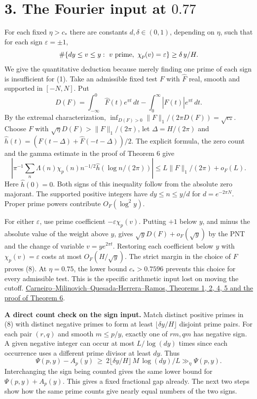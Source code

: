 \documentclass[11pt]{article}
\newcommand{\ch}{\chi_p}
\newcommand{\CM}{\href{https://arxiv.org/pdf/2404.08380v2}{Carneiro--Milinovich--Quesada-Herrera--Ramos, Theorems 1, 2, 4, 5 and the proof of Theorem 6}}
\begin{document}
\section*{3. The Fourier input at \(0.77\)}
For each fixed \(\eta>c_*\) there are constants \(d,\delta\in(0,1)\),
depending on \(\eta\), such that for each sign \(\varepsilon=\pm1\),
\begin{equation}
 \#\{d y\le v\le y:\ v\ {\rm prime},\ \ch(v)=\varepsilon\}
       \ge\delta\,y/H .
 \label{eq:both}
\end{equation}
We give the quantitative deduction because merely finding one prime of
each sign is insufficient for (1). Take an admissible fixed test \(F\)
with \(\widehat F\) real, smooth and supported in \([-N,N]\). Put
\[
 D(F)=\int_{-\infty}^0\widehat F(t)e^{\pi t}\,dt
              -\int_0^\infty|\widehat F(t)|e^{\pi t}\,dt.
\]
By the extremal characterization, \(\inf_{D(F)>0}\|F\|_1/(2\pi D(F))
=\sqrt{c_*}\). Choose \(F\) with
\(\sqrt\eta D(F)>\|F\|_1/(2\pi)\), let \(\Delta=H/(2\pi)\) and
\(\widehat h(t)=(\widehat F(t-\Delta)+\widehat F(-t-\Delta))/2\).
The explicit formula, the zero count and the gamma estimate in the proof
of Theorem 6 give
\[
 \left|\pi^{-1}\sum_n\Lambda(n)\ch(n)n^{-1/2}
                 \widehat h(\log n/(2\pi))\right|
 \le L\|F\|_1/(2\pi)+o_F(L).
\]
Here \(\widehat h(0)=0\). Both signs of this inequality follow from the
absolute zero majorant. The supported positive integers have
\(d y\le n\le y/d\) for \(d=e^{-2\pi N}\). Proper prime powers
contribute \(O_F(\log^2 y)\).

For either \(\varepsilon\), use prime coefficient \(-\varepsilon\ch(v)\).
Putting \(+1\) below \(y\), and minus the absolute value of the weight
above \(y\), gives \(\sqrt y D(F)+o_F(\sqrt y)\) by the PNT and the
change of variable \(v=y e^{2\pi t}\). Restoring each coefficient below
\(y\) with \(\ch(v)=\varepsilon\) costs at most \(O_F(H/\sqrt y)\).
The strict margin in the choice of \(F\) proves (8). At \(\eta=0.75\),
the lower bound \(c_*>0.7596\) prevents this choice for every admissible
test. This is the specific arithmetic input lost on moving the cutoff.
\CM.

\textbf{A direct count check on the sign input.} Match distinct positive
primes in (8) with distinct negative primes to form at least
\(\lfloor\delta y/H\rfloor\) disjoint prime pairs. For each pair \((r,q)\)
and smooth \(m\le p/y\), exactly one of \(rm,qm\) has negative sign.
A given negative integer can occur at most \(L/\log(dy)\) times since
each occurrence uses a different prime divisor at least \(d y\).
Thus
\[
 \Psi(p,y)-A_p(y)\ \ge\
 2\lfloor\delta y/H\rfloor\,M\,\log(dy)/L \gg_\eta\Psi(p,y).
\]
Interchanging the sign being counted gives the same lower bound for
\(\Psi(p,y)+A_p(y)\). This gives a fixed fractional gap already.
The next two steps show how the same prime counts give nearly equal
numbers of the two signs.
\end{document}
